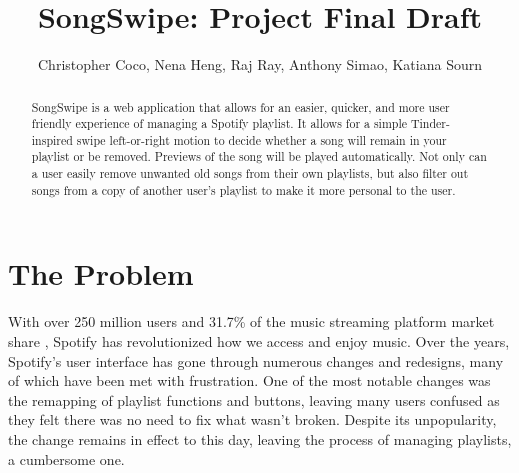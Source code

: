 \documentclass{article}
\title{SongSwipe: Project Final Draft}
\author{Christopher Coco, Nena Heng, Raj Ray, Anthony Simao, Katiana Sourn}
\begin{document}
\maketitle

\begin{abstract}
SongSwipe is a web application that allows for an easier, quicker, and more user friendly experience of managing a Spotify playlist. It allows for a simple Tinder-inspired swipe left-or-right motion to decide whether a song will remain in your playlist or be removed. Previews of the song will be played automatically. Not only can a user easily remove unwanted old songs from their own playlists, but also filter out songs from a copy of another user's playlist to make it more personal to the user.
\end{abstract}

\section{The Problem}
With over 250 million users and 31.7\% of the music streaming platform market share \cite{Spotify_stats}, Spotify \cite{Spotify_app} has revolutionized how we access and enjoy music. Over the years, Spotify's user interface has gone through numerous changes and redesigns, many of which have been met with frustration. One of the most notable changes was the remapping of playlist functions and buttons, leaving many users confused as they felt there was no need to fix what wasn’t broken. Despite its unpopularity, the change remains in effect to this day, leaving the process of managing playlists, a cumbersome one.\\
\end{document}
